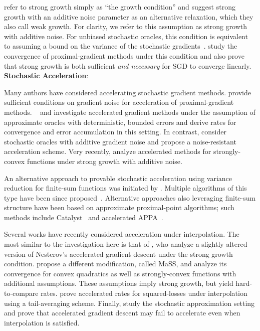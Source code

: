\citet{cevher2018linear} refer to strong growth simply as ``the growth condition'' and suggest strong growth with an additive noise parameter as an alternative relaxation, which they also call weak growth.
For clarity, we refer to this assumption as strong growth with additive noise.
For unbiased stochastic oracles, this condition is equivalent to assuming a bound on the variance of the stochastic gradients~\citep{khaled2020better, ghadimi2012optimal1}.
\citet{cevher2018linear} study the convergence of proximal-gradient methods under this condition and also prove that strong growth is both sufficient \emph{and necessary} for \ac{SGD} to converge linearly.\\


\noindent \textbf{Stochastic Acceleration}: 


Many authors have considered accelerating stochastic gradient methods.
\citet{schmidt2011convergence} provide sufficient conditions on gradient noise for acceleration of proximal-gradient methods.
~\citep{aspremont2008approximate} and \citet{devolder2014first} investigate accelerated gradient methods under the assumption of approximate oracles with deterministic, bounded errors and derive rates for convergence and error accumulation in this setting.
In contrast, \citet{cohen2018acceleration} consider stochastic oracles with additive gradient noise and propose a noise-resistant acceleration scheme.
Very recently, \citet{chen2020understanding} analyze accelerated methods for strongly-convex functions under strong growth with additive noise. 

An alternative approach to provable stochastic acceleration using variance reduction for finite-sum functions was initiated by \citet{allen-zhu2017katyusha}.
Multiple algorithms of this type have been since proposed~\citep{allen-zhou2018katyushax, tang2018restkatyusha, kovalev2020loopless}.
Alternative approaches also leveraging finite-sum structure have been based on approximate proximal-point algorithms; such methods include Catalyst~\citep{lin2017catalyst} and accelerated APPA~\citep{frostig2015unregularizing}.

Several works have recently considered acceleration under interpolation.
The most similar to the investigation here is that of \citet{vaswani2019fast}, who analyze a slightly altered version of Nesterov's accelerated gradient descent under the strong growth condition. 
\citet{liu2020accelerating} propose a different modification, called MaSS, and analyze its convergence for convex quadratics as well as strongly-convex functions with additional assumptions. 
These assumptions imply strong growth, but yield hard-to-compare rates. 
\citet{jain2018accelerating} prove accelerated rates for squared-losses under interpolation using a tail-averaging scheme. 
Finally, \citet{assran2020convergence} study the stochastic approximation setting and prove that accelerated gradient descent may fail to accelerate even when interpolation is satisfied.\\

